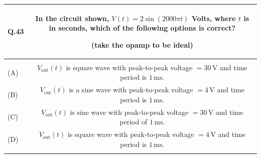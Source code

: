 \documentclass[12pt,a4paper]{article}
\begin{document}
\begin{table}[h!]
\begin{tabular}{|L|C|}
\hline
Q.43 &
In the circuit shown, $V(t) = 2\sin(2000\pi t)$ Volts, where $t$ is in seconds, which of
the following options is correct?

\medskip
(take the opamp to be ideal)

\vspace{0.3cm}
\begin{center}
\end{center}
\\
\hline
 & \\
\hline
(A) & $V_{\mathrm{out}}(t)$ is square wave with peak-to-peak voltage $= 30\,\text{V}$ and time period is $1\,\text{ms}$. \\
\hline
(B) & $V_{\mathrm{out}}(t)$ is a sine wave with peak-to-peak voltage $= 4\,\text{V}$ and time period is $1\,\text{ms}$. \\
\hline
(C) & $V_{\mathrm{out}}(t)$ is sine wave with peak-to-peak voltage $= 30\,\text{V}$ and time period of $1\,\text{ms}$. \\
\hline
(D) & $V_{\mathrm{out}}(t)$ is square wave with peak-to-peak voltage $= 4\,\text{V}$ and time period is $1\,\text{ms}$. \\
\hline
 & \\
\hline
\end{tabular}
\end{table}
\end{document}
